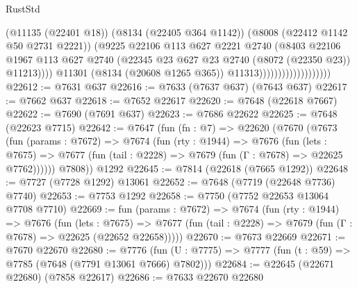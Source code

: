 \begin{lexlean}{RustStd}
\begin{coremodule}
                                            (@11135 (@22401 @18))
                                            (@8134 (@22405 @364 @1142))
                                            (@8008 (@22412 @1142 @50 @2731 @2221))
                                            (@9225
                                              @22106
                                              @113
                                              @627
                                              @2221
                                              @2740
                                              (@8403
                                                @22106
                                                @1967
                                                @113
                                                @627
                                                @2740
                                                (@22345
                                                  @23
                                                  @627
                                                  @23
                                                  @2740
                                                  (@8072 (@22350 @23))
                                                  @11213))))
                                          @11301
                                          (@8134 (@20608 @1265 @365))
                                          @11313)))))))))))))))))))
@22612 := @7631 @637
@22616 := @7633 (@7637 @637) (@7643 @637)
@22617 := @7662 @637
@22618 := @7652 @22617
@22620 := @7648 (@22618 @7667)
@22622 := @7690 (@7691 @637)
@22623 := @7686 @22622
@22625 := @7648 (@22623 @7715)
@22642 := @7647
    (fun (fn : @7) =>
    @22620
      (@7670
        (@7673
          (fun (params : @7672) =>
          @7674
            (fun (rty : @1944) =>
            @7676
              (fun (lets : @7675) =>
              @7677 (fun (tail : @2228) => @7679 (fun (Γ : @7678) => @22625 @7762))))))
        @7808))
    @1292
@22645 := @7814 (@22618 (@7665 @1292))
@22648 := @7727 (@7728 @1292) @13061
@22652 := @7648 (@7719 (@22648 @7736) @7740)
@22653 := @7753 @1292
@22658 := @7750 (@7752 @22653 @13064 @7708 @7710)
@22669 := fun (params : @7672) =>
  @7674
    (fun (rty : @1944) =>
    @7676
      (fun (lets : @7675) =>
      @7677 (fun (tail : @2228) => @7679 (fun (Γ : @7678) => @22625 (@22652 @22658)))))
@22670 := @7673 @22669
@22671 := @7670 @22670
@22680 := @7776
    (fun (U : @7775) => @7777 (fun (t : @59) => @7785 (@7648 (@7791 @13061 @7666) @7802)))
@22684 := @22645 (@22671 @22680) (@7858 @22617)
@22686 := @7633 @22670 @22680

\end{coremodule}
\end{lexlean}
